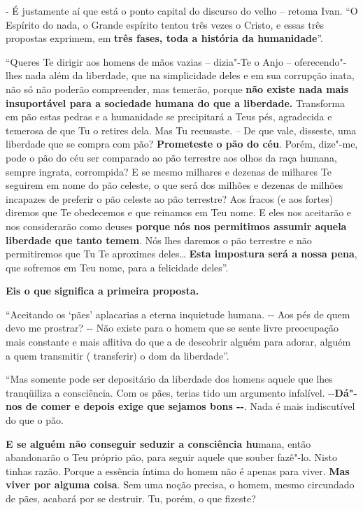- É justamente aí que está o ponto capital do discurso do velho --
retoma Ivan. ``O Espírito do nada, o Grande espírito tentou três vezes o
Cristo, e essas três propostas exprimem, em \textbf{três fases, toda a
história da humanidade}''.

``Queres Te dirigir aos homens de mãos vazias -- dizia"-Te o Anjo --
oferecendo"-lhes nada além da liberdade, que na simplicidade deles e em
sua corrupção inata, não só não poderão compreender, mas temerão, porque
\textbf{não existe nada mais insuportável para a sociedade humana do que
a liberdade.} Transforma em pão estas pedras e a humanidade se
precipitará a Teus pés, agradecida e temerosa de que Tu o retires dela.
Mas Tu recusaste. -- De que vale, disseste, uma liberdade que se compra
com pão? \textbf{Prometeste o pão do céu}. Porém, dize"-me, pode o pão do
céu ser comparado ao pão terrestre aos olhos da raça humana, sempre
ingrata, corrompida? E se mesmo milhares e dezenas de milhares Te
seguirem em nome do pão celeste, o que será dos milhões e dezenas de
milhões incapazes de preferir o pão celeste ao pão terrestre? Aos fracos
(e aos fortes) diremos que Te obedecemos e que reinamos em Teu nome. E
eles nos aceitarão e nos considerarão como deuses \textbf{porque nós nos
permitimos assumir aquela liberdade que tanto temem}. Nós lhes daremos o
pão terrestre e não permitiremos que Tu Te aproximes deles\ldots{}
\textbf{Esta impostura será a nossa pena}, que sofremos em Teu nome,
para a felicidade deles''.

\textbf{Eis o que significa a primeira proposta.}

``Aceitando os `pães' aplacarias a eterna inquietude humana. -\/- Aos
pés de quem devo me prostrar? -\/- Não existe para o homem que se sente
livre preocupação mais constante e mais aflitiva do que a de descobrir
alguém para adorar, alguém a quem transmitir ( transferir) o dom da
liberdade''.

``Mas somente pode ser depositário da liberdade dos homens aquele que
lhes tranqüiliza a consciência. Com os pães, terias tido um argumento
infalível. -\/-\textbf{Dá"-nos de comer e depois exige que sejamos bons
-\/-}. Nada é mais indiscutível do que o pão.

\textbf{E se alguém não conseguir seduzir a consciência hu}mana, então
abandonarão o Teu próprio pão, para seguir aquele que souber fazê"-lo.
Nisto tinhas razão. Porque a essência íntima do homem não é apenas para
viver. \textbf{Mas viver por alguma coisa}. Sem uma noção precisa, o
homem, mesmo circundado de pães, acabará por se destruir. Tu, porém, o
que fizeste?

